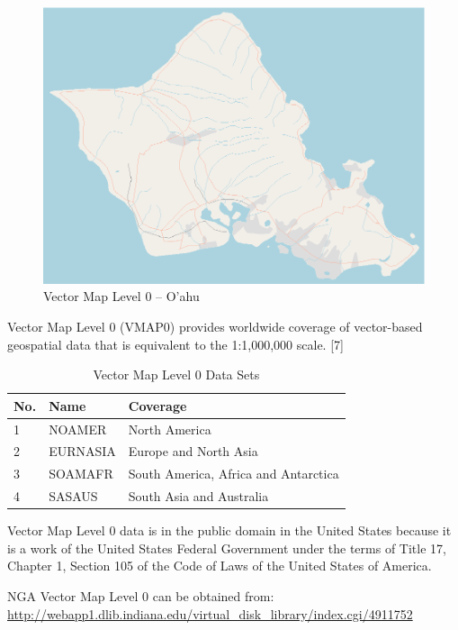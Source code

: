\begin{figure}[h!]
  \centering
  \includegraphics[width=120mm]{images/vmap0_oahu.eps}
  \caption{Vector Map Level 0 -- O'ahu}
\end{figure}

Vector Map Level 0 (VMAP0) provides worldwide coverage of vector-based geospatial data that is equivalent to the 1:1,000,000 scale. [7]

\begin{table}[h!]
  \begin{center}
    \begin{tabular}{ l | l | l }
      \toprule
      \textbf{No.} & \textbf{Name} & \textbf{Coverage} \\ \midrule
      1 & NOAMER   & North America \\
      2 & EURNASIA & Europe and North Asia \\
      3 & SOAMAFR  & South America, Africa and Antarctica \\
      4 & SASAUS   & South Asia and Australia \\
      \bottomrule
    \end{tabular}
    \caption{Vector Map Level 0 Data Sets}
  \end{center}
\end{table}

Vector Map Level 0 data is in the public domain in the United States because it is a work of the United States Federal Government under the terms of Title 17, Chapter 1, Section 105 of the Code of Laws of the United States of America.

NGA Vector Map Level 0 can be obtained from: \cite{Terrain-VMAP0} \\
\url{http://webapp1.dlib.indiana.edu/virtual_disk_library/index.cgi/4911752}

